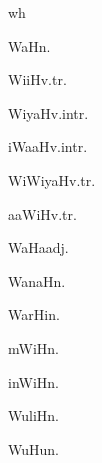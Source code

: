 \begin{multicols*}{2}
\begin{dictroot}{w}{h}
    \begin{dictentry}{WaH}{n.}
    \end{dictentry}
    \begin{dictentry}{WiiH}{v.tr.}
    \end{dictentry}
    \begin{dictentry}{WiyaH}{v.intr.}
    \end{dictentry}
    \begin{dictentry}{iWaaH}{v.intr.}
    \end{dictentry}
    \begin{dictentry}{WiWiyaH}{v.tr.}
    \end{dictentry}
    \begin{dictentry}{aaWiH}{v.tr.}
    \end{dictentry}
    \begin{dictentry}{WaHa}{adj.}
    \end{dictentry}
    \begin{dictentry}{WanaH}{n.}
    \end{dictentry}
    \begin{dictentry}{WarHi}{n.}
    \end{dictentry}
    \begin{dictentry}{mWiH}{n.}
    \end{dictentry}
    \begin{dictentry}{inWiH}{n.}
    \end{dictentry}
    \begin{dictentry}{WuliH}{n.}
    \end{dictentry}
    \begin{dictentry}{WuHu}{n.}
    \end{dictentry}

\end{dictroot}
\end{multicols*}
